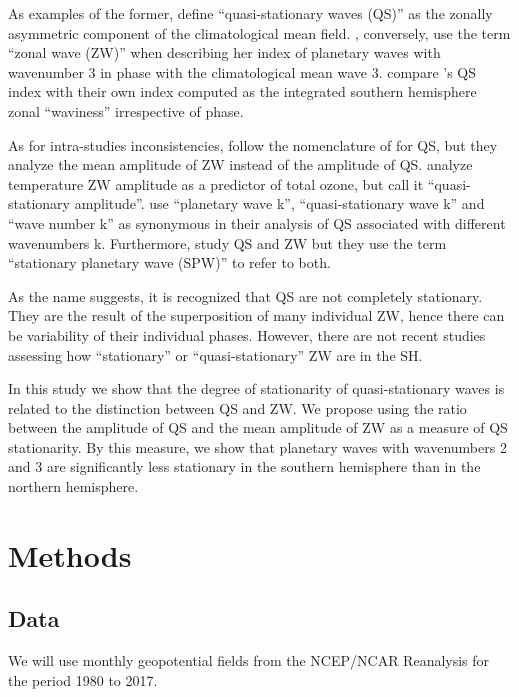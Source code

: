 \documentclass[draft,linenumbers]{agujournal2018}
\begin{document}
As examples of the former, \citet{Quintanar1995a} define
``quasi-stationary waves (QS)'' as the zonally asymmetric component of
the climatological mean field. \citet{Raphael2004}, conversely, use the
term ``zonal wave (ZW)'' when describing her index of planetary waves
with wavenumber 3 in phase with the climatological mean wave 3.
\citet{Irving2015} compare \citet{Raphael2004}'s QS index with their own
index computed as the integrated southern hemisphere zonal ``waviness''
irrespective of phase.

As for intra-studies inconsistencies, \citet{Rao2004} follow the
nomenclature of \citet{Quintanar1995a} for QS, but they analyze the mean
amplitude of ZW instead of the amplitude of QS. \citet{Kravchenko2012}
analyze temperature ZW amplitude as a predictor of total ozone, but call
it ``quasi-stationary amplitude''. \citet{Turner2017} use ``planetary
wave k'', ``quasi-stationary wave k'' and ``wave number k'' as
synonymous in their analysis of QS associated with different wavenumbers
k. Furthermore, \citet{Lastovicka2018} study QS and ZW but they use the
term ``stationary planetary wave (SPW)'' to refer to both.

As the name suggests, it is recognized that QS are not completely
stationary. They are the result of the superposition of many individual
ZW, hence there can be variability of their individual phases. However,
there are not recent studies assessing how ``stationary'' or
``quasi-stationary'' ZW are in the SH.

In this study we show that the degree of stationarity of
quasi-stationary waves is related to the distinction between QS and ZW.
We propose using the ratio between the amplitude of QS and the mean
amplitude of ZW as a measure of QS stationarity. By this measure, we
show that planetary waves with wavenumbers 2 and 3 are significantly
less stationary in the southern hemisphere than in the northern
hemisphere.

\section{Methods}

\subsection{Data}

We will use monthly geopotential fields from the NCEP/NCAR Reanalysis
\citep{Kalnay1996} for the period 1980 to 2017.
\end{document}
